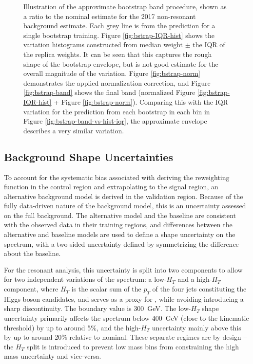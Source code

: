 \begin{figure}[ht]
	\caption{Illustration of the approximate bootstrap band procedure, shown as a ratio to the nominal estimate 
	for the 2017 non-resonant background estimate. Each grey line is from the \mhh prediction for a 
	single bootstrap training. Figure \ref{fig:bstrap-IQR-hist} shows 
	the variation histograms constructed from median weight $\pm$ the IQR of the replica weights. It can be seen 
	that this captures the rough shape of the bootstrap envelope, but is not good estimate for the overall magnitude
	of the variation. Figure \ref{fig:bstrap-norm} demonstrates the applied normalization correction, and Figure 
	\ref{fig:bstrap-band} shows the final band (normalized Figure \ref{fig:bstrap-IQR-hist} + 
	Figure \ref{fig:bstrap-norm}). Comparing this with the IQR variation for the prediction from each bootstrap 
	in each bin in Figure \ref{fig:bstrap-band-vs-hist-iqr}, the approximate envelope describes a very similar variation.}
	\label{fig:bootstrap-breakdown}
\end{figure}

\FloatBarrier
\subsection{Background Shape Uncertainties}
To account for the systematic bias associated with deriving the reweighting function
in the control region and extrapolating to the signal region, an alternative background
model is derived in the validation region. Because of the fully data-driven nature of the 
background model, this is an uncertainty assessed on the full background. The alternative model 
and the baseline are consistent with the observed data in their training regions, and 
differences between the alternative and baseline models are used to define a shape uncertainty on the \mhh
spectrum, with a two-sided uncertainty defined by symmetrizing the difference about
the baseline.

For the resonant analysis, this uncertainty is split into two components to allow for two 
independent variations of the \mhh spectrum: a low-$H_{T}$ and a high-$H_{T}$ component,
where $H_{T}$ is the scalar sum of the $p_{T}$ of the four jets constituting the
Higgs boson candidates, and serves as a proxy for \mhh, while avoiding
introducing a sharp discontinuity. The boundary value is \SI{300}{\GeV}. The
low-$H_{T}$ shape uncertainty primarily affects the \mhh spectrum below
\SI{400}{\GeV} (close to the kinematic threshold) by up to around 5\%, and the
high-$H_{T}$ uncertainty mainly \mhh above this by up to around 20\% relative to
nominal. These separate \mhh regimes are by design -- the $H_{T}$ split is 
introduced to prevent low mass bins from constraining the high mass uncertainty 
and vice-versa. 

